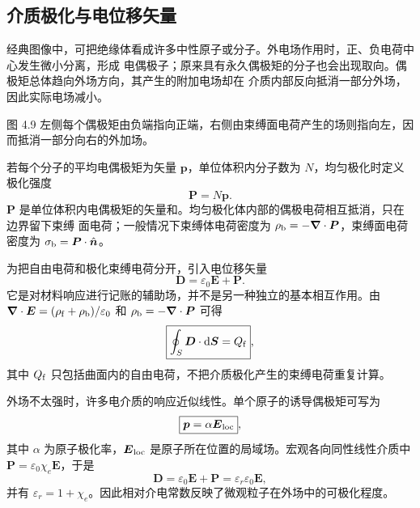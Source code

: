 \subsection*{介质极化与电位移矢量}

经典图像中，可把绝缘体看成许多中性原子或分子。外电场作用时，正、负电荷中心发生微小分离，形成
电偶极子；原来具有永久偶极矩的分子也会出现取向。偶极矩总体趋向外场方向，其产生的附加电场却在
介质内部反向抵消一部分外场，因此实际电场减小。

图 4.9 左侧每个偶极矩由负端指向正端，右侧由束缚面电荷产生的场则指向左，因而抵消一部分向右的外加场。

\polarizationFigure
{}

若每个分子的平均电偶极矩为矢量 $\boldsymbol p$，单位体积内分子数为 $N$，均匀极化时定义极化强度
\begin{equation}
  \boxed{\boldsymbol P=N\boldsymbol p}.
\end{equation}
$\boldsymbol P$ 是单位体积内电偶极矩的矢量和。均匀极化体内部的偶极电荷相互抵消，只在边界留下束缚
面电荷；一般情况下束缚体电荷密度为 $\rho_{\rm b}=-\boldsymbol\nabla\cdot\boldsymbol P$，束缚面电荷
密度为 $\sigma_{\rm b}=\boldsymbol P\cdot\hat{\boldsymbol n}$。

为把自由电荷和极化束缚电荷分开，引入电位移矢量
\begin{equation}
  \boxed{\boldsymbol D=\varepsilon_0\boldsymbol E+\boldsymbol P}.
\end{equation}
它是对材料响应进行记账的辅助场，并不是另一种独立的基本相互作用。由
$\boldsymbol\nabla\cdot\boldsymbol E=(\rho_{\rm f}+\rho_{\rm b})/\varepsilon_0$ 和
$\rho_{\rm b}=-\boldsymbol\nabla\cdot\boldsymbol P$ 可得
\begin{equation}
  \boxed{\oint_S\boldsymbol D\cdot\mathrm d\boldsymbol S=Q_{\rm f}},
\end{equation}
其中 $Q_{\rm f}$ 只包括曲面内的自由电荷，不把介质极化产生的束缚电荷重复计算。

外场不太强时，许多电介质的响应近似线性。单个原子的诱导偶极矩可写为
\begin{equation}
  \boxed{\boldsymbol p=\alpha\boldsymbol E_{\rm loc}},
\end{equation}
其中 $\alpha$ 为原子极化率，$\boldsymbol E_{\rm loc}$ 是原子所在位置的局域场。宏观各向同性线性介质中
$\boldsymbol P=\varepsilon_0\chi_e\boldsymbol E$，于是
\begin{equation}
  \boxed{\boldsymbol D=\varepsilon_0\boldsymbol E+\boldsymbol P
  =\varepsilon_r\varepsilon_0\boldsymbol E},
\end{equation}
并有 $\varepsilon_r=1+\chi_e$。因此相对介电常数反映了微观粒子在外场中的可极化程度。

